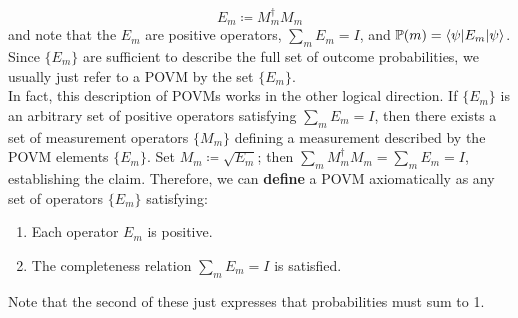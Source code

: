 \documentclass[12pt,a4paper]{report}
\begin{document}
\begin{equation}
	E_{m}\coloneqq M_{m}^{\dagger}M_{m}
\end{equation}
and note that the $E_{m}$ are positive operators, $\sum_{m}E_{m}=I$, and $\mathbb{P}(m)=\braket{\psi|E_{m}|\psi}$. Since $\{E_{m}\}$ are sufficient to describe the full set of outcome probabilities, we usually just refer to a POVM by the set $\{E_{m}\}$.\\
In fact, this description of POVMs works in the other logical direction. If $\{E_{m}\}$ is an arbitrary set of positive operators satisfying $\sum_{m}E_{m}=I$, then there exists a set of measurement operators $\{M_{m}\}$ defining a measurement described by the POVM elements $\{E_{m}\}$. Set $M_{m}\coloneqq \sqrt{E_{m}}$; then $\sum_{m}M_{m}^{\dagger}M_{m}=\sum_{m}E_{m}=I$, establishing the claim. Therefore, we can \textbf{define} a POVM axiomatically as any set of operators $\{E_{m}\}$ satisfying:
\begin{enumerate}
	\item Each operator $E_{m}$ is positive.
	\item The completeness relation $\sum_{m}E_{m}=I$ is satisfied.
\end{enumerate}
Note that the second of these just expresses that probabilities must sum to 1.
\end{document}
